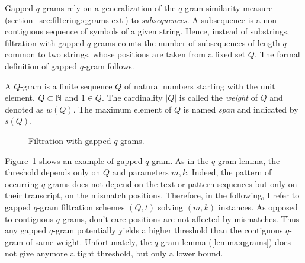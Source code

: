 Gapped $q$-grams rely on a generalization of the $q$-gram similarity measure (section~\ref{sec:filtering:qgrams-ext}) to \emph{subsequences}.
A subsequence is a non-contiguous sequence of symbols of a given string.
Hence, instead of substrings, filtration with gapped $q$-grams counts the number of subsequences of length $q$ common to two strings, whose positions are taken from a fixed set $Q$.
The formal definition of gapped $q$-gram follows.

\begin{definition}
A $Q$-gram is a finite sequence $Q$ of natural numbers starting with the unit element, \ie $Q \subset \mathbb {N}$ and $1 \in Q$.
The cardinality $|Q|$ is called the \emph{weight} of $Q$ and denoted as $w(Q)$.
The maximum element of $Q$ is named \emph{span} and indicated by $s(Q)$.
\end{definition}

\begin{figure}[h]
\begin{center}
\caption[Filtration with gapped $q$-grams]{Filtration with gapped $q$-grams.}
\label{fig:qgrams-gapped}

\end{center}
\end{figure}

Figure~\ref{fig:qgrams-gapped} shows an example of gapped $q$-gram.
As in the $q$-gram lemma, the threshold depends only on $Q$ and parameters $m,k$.
Indeed, the pattern of occurring $q$-grams does not depend on the text or pattern sequences but only on their transcript, \ie on the mismatch positions.
Therefore, in the following, I refer to gapped $q$-gram filtration schemes $(Q,t)$ solving $(m,k)$ instances.
As opposed to contiguous $q$-grams, don't care positions are not affected by mismatches.
Thus any gapped $q$-gram potentially yields a higher threshold than the contiguous $q$-gram of same weight.
Unfortunately, the $q$-gram lemma (\ref{lemma:qgrams}) does not give anymore a tight threshold, but only a lower bound.

